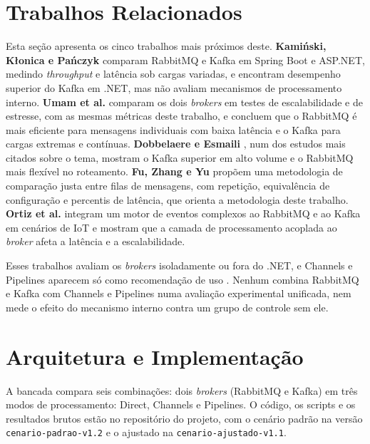\documentclass[12pt]{article}
\begin{document}

\section{Trabalhos Relacionados}
\label{sec:relacionados}

Esta seção apresenta os cinco trabalhos mais próximos deste.
\textbf{Kamiński, Kłonica e Pańczyk} \cite{kaminski:2025} comparam RabbitMQ e Kafka em
Spring Boot e ASP.NET, medindo \textit{throughput} e latência sob cargas variadas, e encontram
desempenho superior do Kafka em .NET, mas não avaliam mecanismos de processamento
interno. \textbf{Umam et al.} \cite{umam:2026} comparam os dois \textit{brokers} em testes de
escalabilidade e de estresse, com as mesmas métricas deste trabalho, e concluem que o
RabbitMQ é mais eficiente para mensagens individuais com baixa latência e o Kafka para
cargas extremas e contínuas. \textbf{Dobbelaere e Esmaili} \cite{dobbelaere:2017}, num
dos estudos mais citados sobre o tema, mostram o Kafka superior em alto volume e o
RabbitMQ mais flexível no roteamento. \textbf{Fu, Zhang e Yu} \cite{fu:2021} propõem uma
metodologia de comparação justa entre filas de mensagens, com repetição, equivalência de
configuração e percentis de latência, que orienta a metodologia deste trabalho.
\textbf{Ortiz et al.} \cite{ortiz:2023} integram um motor de eventos complexos ao
RabbitMQ e ao Kafka em cenários de IoT e mostram que a camada de processamento acoplada ao
\textit{broker} afeta a latência e a escalabilidade.

Esses trabalhos avaliam os \textit{brokers} isoladamente ou fora do .NET, e Channels e Pipelines
aparecem só como recomendação de uso \cite{cleary:2019}. Nenhum combina RabbitMQ e Kafka
com Channels e Pipelines numa avaliação experimental unificada, nem mede o efeito do
mecanismo interno contra um grupo de controle sem ele.


\section{Arquitetura e Implementação}
\label{sec:implementacao}

A bancada compara seis combinações: dois \textit{brokers} (RabbitMQ e Kafka) em três modos de
processamento: Direct, Channels e Pipelines. O código, os scripts e os resultados brutos
estão no repositório do projeto, com o cenário padrão na versão
\texttt{cenario-padrao-v1.2} e o ajustado na \texttt{cenario-ajustado-v1.1}.
\end{document}
